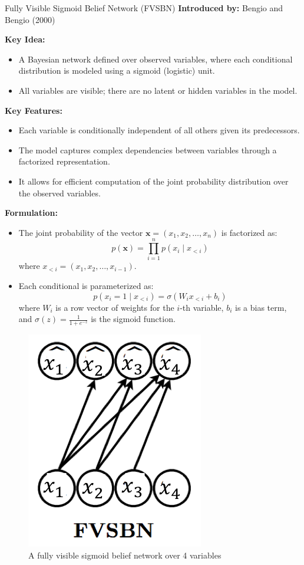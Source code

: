 \begin{frame}[allowframebreaks]{Fully Visible Sigmoid Belief Network (FVSBN)}
\textbf{Introduced by:} Bengio and Bengio (2000)

\textbf{Key Idea:}
\begin{itemize}
    \item A Bayesian network defined over observed variables, where each conditional distribution is modeled using a sigmoid (logistic) unit.
    \item All variables are visible; there are no latent or hidden variables in the model.
\end{itemize}

\textbf{Key Features:}
\begin{itemize}
    \item Each variable is conditionally independent of all others given its predecessors.
    \item The model captures complex dependencies between variables through a factorized representation.
    \item It allows for efficient computation of the joint probability distribution over the observed variables.
\end{itemize}

\framebreak

\textbf{Formulation:}
\begin{itemize}
    \item The joint probability of the vector $\mathbf{x} = (x_1, x_2, \ldots, x_n)$ is factorized as:
    \[
        p(\mathbf{x}) = \prod_{i=1}^n p(x_i \mid x_{<i})
    \]
    where $x_{<i} = (x_1, x_2, \ldots, x_{i-1})$.
    \item Each conditional is parameterized as:
    \[
        p(x_i = 1 \mid x_{<i}) = \sigma(W_i x_{<i} + b_i)
    \]
    where $W_i$ is a row vector of weights for the $i$-th variable, $b_i$ is a bias term, and $\sigma(z) = \frac{1}{1 + e^{-z}}$ is the sigmoid function.
\end{itemize}

\framebreak

\begin{figure}
    \centering
    \includegraphics[height=0.7\textheight,keepaspectratio]{images/autoregressive/fvsbn.png}
    \caption*{A fully visible sigmoid belief network over 4 variables}
\end{figure}


\end{frame}
